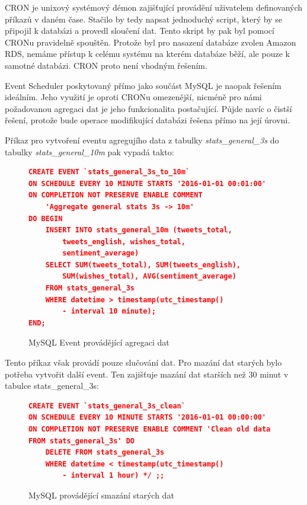\documentclass[thesis=B,czech]{FITthesis}[2012/06/26]
\begin{document}
	CRON je unixový systémový démon zajišťující provádění uživatelem definovaných příkazů v daném čase. Stačilo by tedy napsat jednoduchý script, který by se připojil k databázi a provedl sloučení dat. Tento skript by pak byl pomocí CRONu pravidelně spouštěn. Protože byl pro nasazení databáze zvolen Amazon RDS, nemáme přístup k celému systému na kterém databáze běží, ale pouze k samotné databázi. CRON proto není vhodným řešením. 
	
	Event Scheduler poskytovaný přímo jako součást MySQL je naopak řešením ideálním. Jeho využití je oproti CRONu omezenější, nicméně pro námi požadovanou agregaci dat je jeho funkcionalita postačující. Půjde navíc o čistší řešení, protože bude operace modifikující databázi řešena přímo na její úrovni. 
	
	Příkaz pro vytvoření eventu agregujího data z tabulky \textit{stats\_general\_3s} do tabulky \textit{stats\_general\_10m }pak vypadá takto:

\begin{figure}
\begin{lstlisting}[language=json,firstnumber=1]
CREATE EVENT `stats_general_3s_to_10m` 
ON SCHEDULE EVERY 10 MINUTE STARTS '2016-01-01 00:01:00' 
ON COMPLETION NOT PRESERVE ENABLE COMMENT 
	'Aggregate general stats 3s -> 10m' 
DO BEGIN 
	INSERT INTO stats_general_10m (tweets_total, 
		tweets_english, wishes_total, 
		sentiment_average) 
	SELECT SUM(tweets_total), SUM(tweets_english), 
		SUM(wishes_total), AVG(sentiment_average) 
	FROM stats_general_3s 
	WHERE datetime > timestamp(utc_timestamp() 
		- interval 10 minute); 
END;
\end{lstlisting}
\caption{MySQL Event provádějící agregaci dat}
\label{fig:mysql-event-agr}
\end{figure} 

Tento příkaz však provádí pouze slučování dat. Pro mazání dat starých bylo potřeba vytvořit další event. Ten zajišťuje mazání dat starších než 30 minut v tabulce stats\_general\_3s:

\begin{figure}
\begin{lstlisting}[language=json,firstnumber=1]
CREATE EVENT `stats_general_3s_clean` 
ON SCHEDULE EVERY 10 MINUTE STARTS '2016-01-01 00:00:00' 
ON COMPLETION NOT PRESERVE ENABLE COMMENT 'Clean old data 
FROM stats_general_3s' DO 
	DELETE FROM stats_general_3s
	WHERE datetime < timestamp(utc_timestamp() 
		- interval 1 hour) */ ;;
\end{lstlisting}
\caption{MySQL provádějící smazání starých dat}
\label{fig:mysql-event-del}
\end{figure} 
\end{document}
